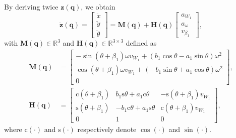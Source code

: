 By deriving twice $\bm{z}(\bm{q})$, we obtain
\begin{equation}
\label{eq:zddot}
    \ddot{\bm{z}}(\bm{q})
    =
    \begin{bmatrix}
        \ddot{x} \\ \ddot{y} \\ \ddot{\theta}
    \end{bmatrix}
    =
    \bm{M}(\bm{q}) +
    \bm{H}(\bm{q})
    \begin{bmatrix}
        a_{W_1} \\ a_{\omega} \\ v_{\beta_1}
    \end{bmatrix},
\end{equation}
with $\bm{M}(\bm{q}) \in \mathbb{R}^3$ and $\bm{H}(\bm{q}) \in \mathbb{R}^{3 \times 3}$ defined as
\begin{align*}
    \bm{M}(\bm{q})
    &=
    \begin{bmatrix}
        -\sin(\theta+\beta_1) \omega v_{W_1} + ( b_1 \cos\theta - a_1 \sin\theta) \omega^2 \\
         \cos(\theta+\beta_1) \omega v_{W_1} + (-b_1 \sin\theta + a_1 \cos\theta) \omega^2 \\
        0
    \end{bmatrix}, \\
    \bm{H}(\bm{q})
    &=
    \begin{bmatrix}
        \mathrm{c}(\theta+\beta_1) &  b_1 \mathrm{s}\theta + a_1 \mathrm{c}\theta & -\mathrm{s}(\theta+\beta_1) v_{W_1} \\
        \mathrm{s}(\theta+\beta_1) & -b_1 \mathrm{c}\theta + a_1 \mathrm{s}\theta &  \mathrm{c}(\theta+\beta_1) v_{W_1} \\
        0 & 1 & 0
    \end{bmatrix},
\end{align*}
where $\mathrm{c}(\cdot)$ and $\mathrm{s}(\cdot)$ respectively denote $\cos(\cdot)$ and $\sin(\cdot)$.

